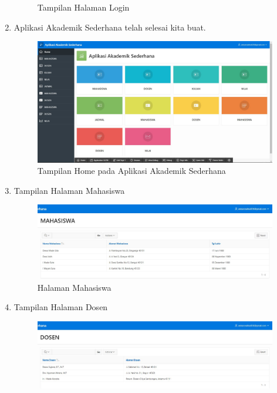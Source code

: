 \begin{enumerate}
\begin{figure}[!htbp]
\begin{center}
    \caption{Tampilan Halaman Login}
    \end{center}   
    \end{figure} 
\item Aplikasi Akademik Sederhana telah selesai kita buat.
    \begin{figure}[!htbp]
    \begin{center}
    \includegraphics[scale=0.4]{section/ica61.JPG}
    \caption{Tampilan Home pada Aplikasi Akademik Sederhana}
    \end{center}   
    \end{figure} 
\item Tampilan Halaman Mahasiswa
    \begin{figure}[!htbp]
    \begin{center}
    \includegraphics[scale=0.4]{section/ica63.JPG}
    \caption{Halaman Mahasiswa}
    \end{center}   
    \end{figure} 
\item Tampilan Halaman Dosen
    \begin{figure}[!htbp]
    \begin{center}
    \includegraphics[scale=0.4]{section/ica64.JPG}

\end{center}
\end{figure}
\end{enumerate}
